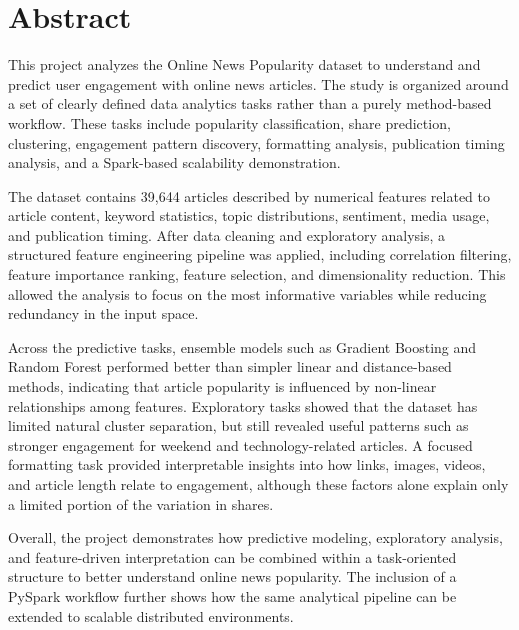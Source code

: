 \section*{Abstract}

This project analyzes the Online News Popularity dataset to understand and predict user engagement with online news articles. The study is organized around a set of clearly defined data analytics tasks rather than a purely method-based workflow. These tasks include popularity classification, share prediction, clustering, engagement pattern discovery, formatting analysis, publication timing analysis, and a Spark-based scalability demonstration.

The dataset contains 39,644 articles described by numerical features related to article content, keyword statistics, topic distributions, sentiment, media usage, and publication timing. After data cleaning and exploratory analysis, a structured feature engineering pipeline was applied, including correlation filtering, feature importance ranking, feature selection, and dimensionality reduction. This allowed the analysis to focus on the most informative variables while reducing redundancy in the input space.

Across the predictive tasks, ensemble models such as Gradient Boosting and Random Forest performed better than simpler linear and distance-based methods, indicating that article popularity is influenced by non-linear relationships among features. Exploratory tasks showed that the dataset has limited natural cluster separation, but still revealed useful patterns such as stronger engagement for weekend and technology-related articles. A focused formatting task provided interpretable insights into how links, images, videos, and article length relate to engagement, although these factors alone explain only a limited portion of the variation in shares.

Overall, the project demonstrates how predictive modeling, exploratory analysis, and feature-driven interpretation can be combined within a task-oriented structure to better understand online news popularity. The inclusion of a PySpark workflow further shows how the same analytical pipeline can be extended to scalable distributed environments.

